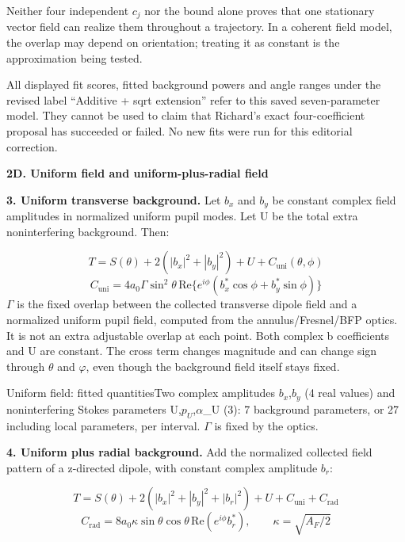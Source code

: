 \documentclass[10pt,a4paper]{article}
\newcommand{\heading}[1]{{\sffamily\Large\bfseries\color{ink}#1}\par\vspace{7pt}}
\begin{document}
Neither four independent \(c_{j}\) nor the bound alone proves that one stationary vector field can realize them throughout a trajectory. In a coherent field model, the overlap may depend on orientation; treating it as constant is the approximation being tested.\par
All displayed fit scores, fitted background powers and angle ranges under the revised label “Additive + sqrt extension” refer to this saved seven-parameter model. They cannot be used to claim that Richard’s exact four-coefficient proposal has succeeded or failed. No new fits were run for this editorial correction.\par
\clearpage
\heading{2D. Uniform field and uniform-plus-radial field}
\textbf{3. Uniform transverse background.} Let \(b_{x}\) and \(b_{y}\) be constant complex field amplitudes in normalized uniform pupil modes. Let U be the total extra noninterfering background. Then:\par
\begin{equation*}T=S(\theta)+2(|b_x|^2+|b_y|^2)+U+C_{\mathrm{uni}}(\theta,\phi)\end{equation*}
\begin{equation*}C_{\mathrm{uni}}=4a_0\Gamma\sin^2\theta\,\mathrm{Re}\{e^{i\phi}(b_x^*\cos\phi+b_y^*\sin\phi)\}\end{equation*}
\(Γ\) is the fixed overlap between the collected transverse dipole field and a normalized uniform pupil field, computed from the annulus/Fresnel/BFP optics. It is not an extra adjustable overlap at each point. Both complex b coefficients and U are constant. The cross term changes magnitude and can change sign through \(θ\) and \(φ\), even though the background field itself stays fixed.\par
\begin{fitbox}{Uniform field: fitted quantities}Two complex amplitudes \(b_{x}\),\(b_{y}\) (4 real values) and noninterfering Stokes parameters U,\(p_{U}\),\(α\)\_U (3): 7 background parameters, or 27 including local parameters, per interval. \(Γ\) is fixed by the optics.\end{fitbox}
\textbf{4. Uniform plus radial background.} Add the normalized collected field pattern of a z-directed dipole, with constant complex amplitude \(b_{r}\):\par
\begin{equation*}T=S(\theta)+2(|b_x|^2+|b_y|^2+|b_r|^2)+U+C_{\mathrm{uni}}+C_{\mathrm{rad}}\end{equation*}
\begin{equation*}C_{\mathrm{rad}}=8a_0\kappa\sin\theta\cos\theta\,\mathrm{Re}(e^{i\phi}b_r^*),\qquad \kappa=\sqrt{A_F/2}\end{equation*}
\end{document}
